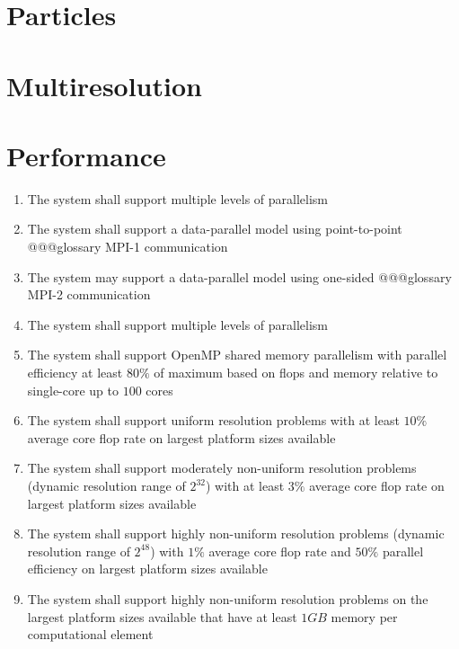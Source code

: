 \documentclass{book}
\begin{document}
\section{Particles}

\section{Multiresolution}

\section{Performance}

\begin{enumerate}
  \item The system shall support multiple levels of parallelism

  \item The system shall support a data-parallel model using point-to-point
  @@@glossary MPI-1 communication

  \item The system may support a data-parallel model using one-sided
  @@@glossary MPI-2 communication

  \item The system shall support multiple levels of parallelism

  \item The system shall support OpenMP shared memory parallelism with
  parallel efficiency at least $80\%$ of maximum based on flops and
  memory relative to single-core up to $100$ cores

  \item The system shall support uniform resolution problems with at least
  $10\%$ average core flop rate on largest platform sizes available

  \item The system shall support moderately non-uniform resolution problems
  (dynamic resolution range of $2^32$) with at least $3\%$ average
  core flop rate on largest platform sizes available

  \item The system shall support highly non-uniform resolution problems
  (dynamic resolution range of $2^48$) with $1\%$ average core flop
  rate and $50\%$ parallel efficiency on largest platform sizes
  available

  \item The system shall support highly non-uniform resolution problems on
  the largest platform sizes available that have at least $1GB$ memory
  per computational element
\end{enumerate}
\end{document}
